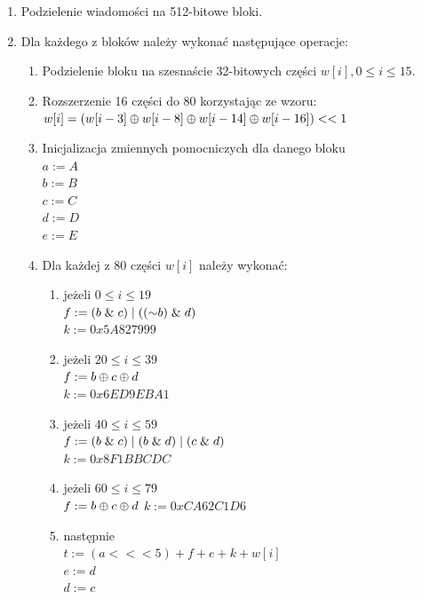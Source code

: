\begin{enumerate}
\begin{enumerate}
{					00000000 00000000 00000000 00000000 \\ 
					00000000 00000000 00000000 00000031 }
		\end{enumerate}
	\item Podzielenie wiadomości na 512-bitowe bloki.
	\item Dla każdego z bloków należy wykonać następujące operacje:
		\begin{enumerate}
			\item Podzielenie bloku na szesnaście 32-bitowych części $w[i], 0 \leq i \leq 15$.
			\item Rozszerzenie 16 części do 80 korzystając ze wzoru: \\
				$w[i] = (w[i-3] \mathbin{\oplus} w[i-8] \mathbin{\oplus} w[i-14] \mathbin{\oplus} w[i-16]) << 1$
			\item Inicjalizacja zmiennych pomocniczych dla danego bloku \\
				$a := A$ \\
				$b := B$ \\
				$c := C$ \\
				$d := D$ \\
				$e := E$ 
			\item Dla każdej z 80 części $w[i]$ należy wykonać:
				\begin{enumerate}
					\item jeżeli $0 \leq i \leq 19$ \\
			        	$f := (b \mathrel{\&} c) \mathrel{|} ((\mathord{\sim} b) \mathrel{\&} d)$ \\
			            $k := 0x5A827999$
					\item jeżeli $20 \leq i \leq 39$ \\
           				$f := b \mathbin{\oplus} c \mathbin{\oplus} d$ \\
          				$k := 0x6ED9EBA1$
				    \item jeżeli $40 \leq i \leq 59$ \\
			        	$f := (b \mathrel{\&} c) \mathrel{|} (b \mathrel{\&} d) \mathrel{|} (c \mathrel{\&} d)$ \\
           				$k := 0x8F1BBCDC$
        			\item jeżeli $60 \leq i \leq 79$ \\
			            $f := b \mathbin{\oplus} c \mathbin{\oplus} d$
   	        			$k := 0xCA62C1D6$
            		\item następnie \\
           				$t := (a <<< 5) + f + e + k + w[i]$ \\
				        $e := d$ \\
				        $d := c$\\

\end{enumerate}
\end{enumerate}
\end{enumerate}
